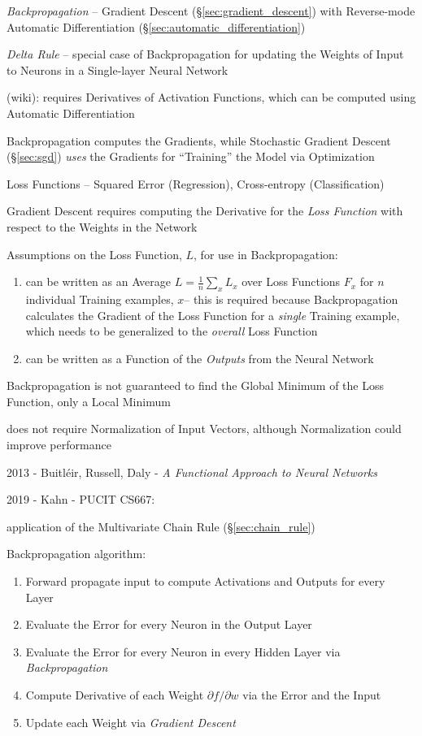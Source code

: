 \emph{Backpropagation} -- Gradient Descent (\S\ref{sec:gradient_descent}) with
Reverse-mode Automatic Differentiation (\S\ref{sec:automatic_differentiation})

\emph{Delta Rule} -- special case of Backpropagation for updating the Weights of
Input to Neurons in a Single-layer Neural Network

(wiki): requires Derivatives of Activation Functions, which can be computed
using Automatic Differentiation

Backpropagation computes the Gradients, while Stochastic Gradient Descent
(\S\ref{sec:sgd}) \emph{uses} the Gradients for ``Training'' the Model via
Optimization

Loss Functions -- Squared Error (Regression), Cross-entropy (Classification)

Gradient Descent requires computing the Derivative for the \emph{Loss Function}
with respect to the Weights in the Network

Assumptions on the Loss Function, $L$, for use in Backpropagation:
\begin{enumerate}
  \item can be written as an Average $L = \frac{1}{n} \sum_x L_x$ over Loss
    Functions $F_x$ for $n$ individual Training examples, $x$-- this is required
    because Backpropagation calculates the Gradient of the Loss Function for a
    \emph{single} Training example, which needs to be generalized to the
    \emph{overall} Loss Function
  \item can be written as a Function of the \emph{Outputs} from the Neural
    Network
\end{enumerate}

Backpropagation is not guaranteed to find the Global Minimum of the Loss
Function, only a Local Minimum

does not require Normalization of Input Vectors, although Normalization could
improve performance

2013 - Buitl\'eir, Russell, Daly -
\emph{A Functional Approach to Neural Networks}

2019 - Kahn - PUCIT CS667:

application of the Multivariate Chain Rule (\S\ref{sec:chain_rule})

Backpropagation algorithm:
\begin{enumerate}
  \item Forward propagate input to compute Activations and Outputs for every
    Layer
  \item Evaluate the Error for every Neuron in the Output Layer
  \item Evaluate the Error for every Neuron in every Hidden Layer via
    \emph{Backpropagation}
  \item Compute Derivative of each Weight $\partial f / \partial w$ via the
    Error and the Input
  \item Update each Weight via \emph{Gradient Descent}
\end{enumerate}

